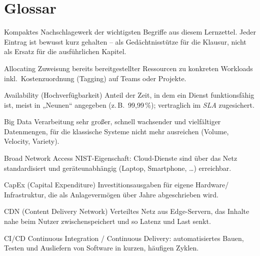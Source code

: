 \clearpage
\section{Glossar}

Kompaktes Nachschlagewerk der wichtigsten Begriffe aus diesem Lernzettel.
Jeder Eintrag ist bewusst kurz gehalten -- als Gedächtnisstütze für die Klausur,
nicht als Ersatz für die ausführlichen Kapitel.


\begin{glossar}

  \item[Allocating] Zuweisung bereits bereitgestellter Ressourcen zu konkreten
        Workloads inkl.\ Kostenzuordnung (Tagging) auf Teams oder Projekte.

  \item[Availability (Hochverfügbarkeit)] Anteil der Zeit, in dem ein Dienst
        funktionsfähig ist, meist in „Neunen“ angegeben (z.\,B.\ 99,99\,\%);
        vertraglich im \emph{SLA} zugesichert.

  \item[Big Data] Verarbeitung sehr großer, schnell wachsender und vielfältiger
        Datenmengen, für die klassische Systeme nicht mehr ausreichen
        (Volume, Velocity, Variety).

  \item[Broad Network Access] NIST-Eigenschaft: Cloud-Dienste sind über das Netz
        standardisiert und geräteunabhängig (Laptop, Smartphone, \dots) erreichbar.

  \item[CapEx (Capital Expenditure)] Investitionsausgaben für eigene Hardware/
        Infrastruktur, die als Anlagevermögen über Jahre abgeschrieben wird.

  \item[CDN (Content Delivery Network)] Verteiltes Netz aus Edge-Servern, das
        Inhalte nahe beim Nutzer zwischenspeichert und so Latenz und Last senkt.

  \item[CI/CD] Continuous Integration / Continuous Delivery: automatisiertes
        Bauen, Testen und Ausliefern von Software in kurzen, häufigen Zyklen.


\end{glossar}
